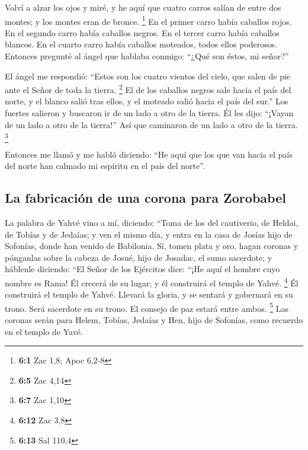  Volví a alzar los ojos y miré, y he aquí que cuatro
carros salían de entre dos montes; y los montes eran de bronce.
\footnote{\textbf{6:1} Zac 1,8; Apoc 6,2-8}  En el primer
carro había caballos rojos. En el segundo carro había caballos negros.
 En el tercer carro había caballos blancos. En el cuarto
carro había caballos moteados, todos ellos poderosos. 
Entonces pregunté al ángel que hablaba conmigo: ``¿Qué son éstos, mi
señor?''

 El ángel me respondió: ``Estos son los cuatro vientos del
cielo, que salen de pie ante el Señor de toda la tierra. \footnote{\textbf{6:5}
  Zac 4,14}  El de los caballos negros sale hacia el país
del norte, y el blanco salió tras ellos, y el moteado salió hacia el
país del sur.''  Los fuertes salieron y buscaron ir de un
lado a otro de la tierra. Él les dijo: ``¡Vayan de un lado a otro de la
tierra!'' Así que caminaron de un lado a otro de la tierra. \footnote{\textbf{6:7}
  Zac 1,10}

 Entonces me llamó y me habló diciendo: ``He aquí que los
que van hacia el país del norte han calmado mi espíritu en el país del
norte''.

\hypertarget{la-fabricaciuxf3n-de-una-corona-para-zorobabel}{%
\subsection{La fabricación de una corona para
Zorobabel}\label{la-fabricaciuxf3n-de-una-corona-para-zorobabel}}

 La palabra de Yahvé vino a mí, diciendo: 
``Toma de los del cautiverio, de Heldai, de Tobías y de Jedaías; y ven
el mismo día, y entra en la casa de Josías hijo de Sofonías, donde han
venido de Babilonia.  Sí, tomen plata y oro, hagan
coronas y pónganlas sobre la cabeza de Josué, hijo de Josadac, el sumo
sacerdote;  y háblenle diciendo: ``El Señor de los
Ejércitos dice: ``¡He aquí el hombre cuyo nombre es Rama! Él crecerá de
su lugar; y él construirá el templo de Yahvé. \footnote{\textbf{6:12}
  Zac 3,8}  Él construirá el templo de Yahvé. Llevará la
gloria, y se sentará y gobernará en su trono. Será sacerdote en su
trono. El consejo de paz estará entre ambos. \footnote{\textbf{6:13} Sal
  110,4}  Las coronas serán para Helem, Tobías, Jedaías y
Hen, hijo de Sofonías, como recuerdo en el templo de Yavé.

